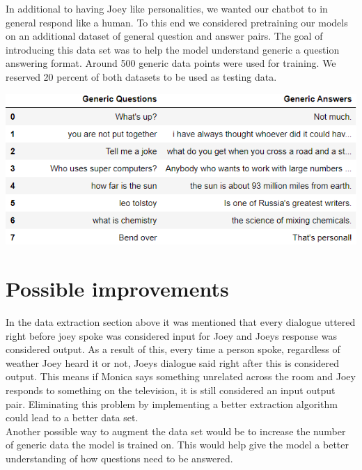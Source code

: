 \documentclass[12pt]{article}
\begin{document}
In additional to having Joey like personalities, we wanted our chatbot to in general respond like a human. To this end we considered pretraining our models on an additional dataset of general question and answer pairs. The goal of introducing this data set was to help the model understand generic a question answering format. Around 500 generic data points were used for training. We reserved 20 percent of both datasets to be used as testing data.
\begin{center}
\includegraphics[width=160mm]{genericData.PNG}
\end{center}

\section*{Possible improvements}
In the data extraction section above it was mentioned that every dialogue uttered right before joey spoke was considered input for Joey and Joeys response was considered output. As a result of this, every time a person spoke, regardless of weather Joey heard it or not, Joeys dialogue said right after this is considered output. This means if Monica says something unrelated across the room and Joey responds to something on the television, it is still considered an input output pair. Eliminating this problem by implementing a better extraction algorithm could lead to a better data set. \\

Another possible way to augment the data set would be to increase the number of generic data the model is trained on. This would help give the model a better understanding of how questions need to be answered.
\end{document}
